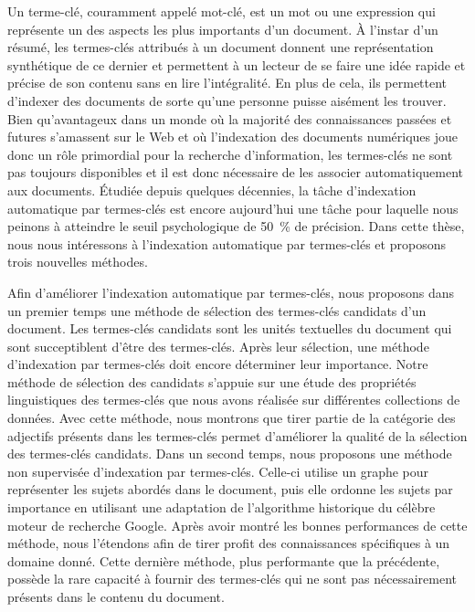 Un terme-clé, couramment appelé mot-clé, est un mot ou une expression qui
représente un des aspects les plus importants d'un document. À l'instar d'un
résumé, les termes-clés attribués à un document donnent une représentation
synthétique de ce dernier et permettent à un lecteur de se faire une idée rapide
et précise de son contenu sans en lire l'intégralité. En plus de cela, ils
permettent d'indexer des documents de sorte qu'une personne puisse aisément les
trouver. Bien qu'avantageux dans un monde où la majorité des connaissances
passées et futures s'amassent sur le Web et où l'indexation des documents
numériques joue donc un rôle primordial pour la recherche d'information, les
termes-clés ne sont pas toujours disponibles et il est donc nécessaire de les
associer automatiquement aux documents. Étudiée depuis quelques décennies, la
tâche d'indexation automatique par termes-clés est encore aujourd'hui une tâche
pour laquelle nous peinons à atteindre le \og{}seuil psychologique\fg{} de 50~\%
de précision. Dans cette thèse, nous nous intéressons à l'indexation automatique
par termes-clés et proposons trois nouvelles méthodes.

Afin d'améliorer l'indexation automatique par termes-clés, nous proposons dans
un premier temps une méthode de sélection des termes-clés candidats d'un
document. Les termes-clés candidats sont les unités textuelles du document qui
sont succeptiblent d'être des termes-clés. Après leur sélection, une méthode
d'indexation par termes-clés doit encore déterminer leur importance. Notre
méthode de sélection des candidats s'appuie sur une étude des propriétés
linguistiques des termes-clés que nous avons réalisée sur différentes
collections de données. Avec cette méthode, nous montrons que tirer partie de la
catégorie des adjectifs présents dans les termes-clés permet d'améliorer la
qualité de la sélection des termes-clés candidats. Dans un second temps, nous
proposons une méthode non supervisée d'indexation par termes-clés. Celle-ci
utilise un graphe pour représenter les sujets abordés dans le document, puis
elle ordonne les sujets par importance en utilisant une adaptation de
l'algorithme historique du célèbre moteur de recherche Google. Après avoir
montré les bonnes performances de cette méthode, nous l'étendons afin de tirer
profit des connaissances spécifiques à un domaine donné. Cette dernière méthode,
plus performante que la précédente, possède la rare capacité à fournir des
termes-clés qui ne sont pas nécessairement présents dans le contenu du document.

